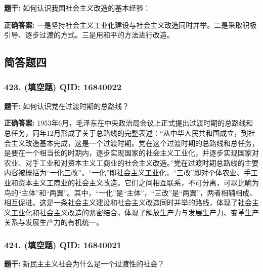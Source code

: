 \documentclass[12pt,UTF8]{ctexart}
\begin{document}
\textbf{题干:}
如何认识我国社会主义改造的基本经验：

\textbf{正确答案:}
一是坚持社会主义工业化建设与社会主义改造同时并举。二是采取积极引导、逐步过渡的方式。三是用和平的方法进行改造。

\vspace{0.3em}\hrulefill\vspace{0.7em}

\subsection*{简答题四}

\subsubsection*{423. (填空题) \small QID: 16840022}

\textbf{题干:}
如何认识党在过渡时期的总路线？

\textbf{正确答案:}
1953年6月，毛泽东在中央政治局会议上正式提出过渡时期的总路线和总任务，同年12月形成了关于总路线的完整表述：“从中华人民共和国成立，到社会主义改造基本完成，这是一个过渡时期。党在这个过渡时期的总路线和总任务，是要在一个相当长的时期内，逐步实现国家的社会主义工业化，并逐步实现国家对农业、对手工业和对资本主义工商业的社会主义改造。”党在过渡时期总路线的主要内容被概括为“一化三改”。“一化”即社会主义工业化，“三改”即对个体农业、手工业和资本主义工商业的社会主义改造。它们之间相互联系，不可分离，可以比喻为鸟的“主体”和“两翼”。其中，“一化”是“主体”，“三改”是“两翼”，两者相辅相成、相互促进。这是一条社会主义建设和社会主义改造同时并举的路线，体现了社会主义工业化和社会主义改造的紧密结合，体现了解放生产力与发展生产力、变革生产关系与发展生产力的有机统一。

\vspace{0.3em}\hrulefill\vspace{0.7em}

\subsubsection*{424. (填空题) \small QID: 16840021}

\textbf{题干:}
新民主主义社会为什么是一个过渡性的社会？
\end{document}
